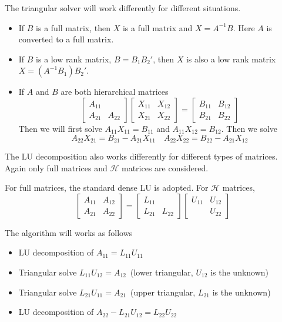 \documentclass[10pt,a4paper]{article}
\theoremstyle{definition}
\begin{document}
The triangular solver will work differently for different situations.
\begin{itemize}
	\item If $B$ is a full matrix, then $X$ is a full matrix and $X=A^{-1}B$. Here $A$ is converted to a full matrix.
	\item If $B$ is a low rank matrix, $B=B_1B_2'$, then $X$ is also a low rank matrix $X = (A^{-1}B_1)B_2'$.
	\item If $A$ and $B$ are both hierarchical matrices
	\[\left[ {\begin{array}{*{20}{c}}
{{A_{11}}}&{}\\
{{A_{21}}}&{{A_{22}}}
\end{array}} \right]\left[ {\begin{array}{*{20}{c}}
{{X_{11}}}&{{X_{12}}}\\
{{X_{21}}}&{{X_{22}}}
\end{array}} \right] = \left[ {\begin{array}{*{20}{c}}
{{B_{11}}}&{{B_{12}}}\\
{{B_{21}}}&{{B_{22}}}
\end{array}} \right]\]
Then we will first solve $A_{11}X_{11}=B_{11}$ and $A_{11}X_{12}=B_{12}$. Then we solve
\begin{equation}
	A_{22}X_{21} = B_{21}-A_{21}X_{11}\quad A_{22}X_{22} = B_{22}-A_{21}X_{12}
\end{equation}	
\end{itemize}

The LU decomposition also works differently for different types of matrices. Again only full matrices and $\mathcal{H}$ matrices are considered. 

For full matrices, the standard dense LU is adopted. For $\mathcal{H}$ matrices, 
\[\left[ {\begin{array}{*{20}{c}}
{{A_{11}}}&{{A_{12}}}\\
{{A_{21}}}&{{A_{22}}}
\end{array}} \right] = \left[ {\begin{array}{*{20}{c}}
{{L_{11}}}&\\
{{L_{21}}}&{{L_{22}}}
\end{array}} \right]\left[ {\begin{array}{*{20}{c}}
{{U_{11}}}&{{U_{12}}}\\
{}&{{U_{22}}}
\end{array}} \right]\]

The algorithm will works as follows
\begin{itemize}
	\item LU decomposition of $A_{11}=L_{11}U_{11}$
	\item Triangular solve $L_{11}U_{12}=A_{12}$~(lower triangular, $U_{12}$ is the unknown)
	\item Triangular solve $L_{21}U_{11} = A_{21}$~(upper triangular, $L_{21}$ is the unknown)
	\item LU decomposition of $A_{22}-L_{21}U_{12}=L_{22}U_{22}$
\end{itemize}	
\end{document}
